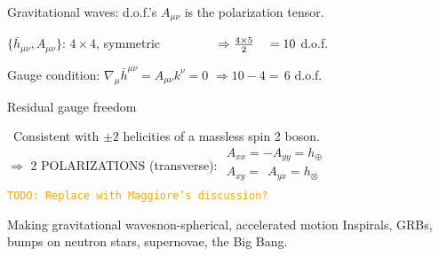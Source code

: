 \documentclass[xcolor=dvipsnames,handout,t]{beamer}
\newcommand{\todo}[1]{\textcolor{orange}{\texttt{TODO: #1}}}
\newcommand{\f}{\frac}
\begin{document}
\begin{frame}{Gravitational waves: d.o.f.'s}
$A_{\mu\nu} $ is the polarization tensor.
\begin{itemize}
{\item $\{ \bar{h}_{\mu\nu}, A_{\mu\nu} \}$: $4\times4$, symmetric {$\hspace{1.5cm}\Rightarrow \f{4\times 5}{2}\ \ \ = 10$ d.o.f.}}
 {\item Gauge condition: $\nabla_\mu \bar{h}^{\mu\nu} =  A_{\mu\nu} k^\nu= 0${ $\Rightarrow10-4 = \,6$ d.o.f.}}
 {\item Residual gauge freedom }
\end{itemize}
{\quad \ Consistent with $\pm 2$ helicities of a \alert{massless} spin 2 boson.\\}
{$\Rightarrow$ \alert{2} POLARIZATIONS (\alert{transverse}): {$\begin{array}{l}A_{xx}=-A_{yy} = h_\oplus  \\ A_{xy}=\ \ A_{yx} = h_\otimes  \\ \end{array}$}}
\\
\todo{Replace with Maggiore's discussion?}
{\begin{center}  \hspace{1cm} \end{center}}
\end{frame}

\begin{frame}{Making gravitational waves}{non-spherical, accelerated motion}
 \alert{Inspirals}, GRBs, bumps on neutron stars, supernovae, the Big Bang. \\%
 \uncover<3->{\begin{center} $ \boxed{\dot{E}=L_\text{GW} = \f{G}{c^5} \langle (\partial_t^3 \bar{Q}_{ij})^2 \rangle}$\\\vspace{2mm}}
 
\end{frame}
\end{document}
